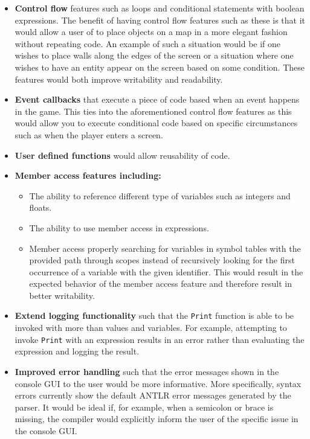 \begin{itemize}
    \item
      \textbf{Control flow} features such as loops and conditional statements with boolean expressions. The benefit of having control flow features such as these is that it would allow a user of \dazel{} to place objects on a map in a more elegant fashion without repeating code. An example of such a situation would be if one wishes to place walls along the edges of the screen or a situation where one wishes to have an entity appear on the screen based on some condition. These features would both improve writability and readability.
    \item
      \textbf{Event callbacks} that execute a piece of code based when an event happens in the game. This ties into the aforementioned control flow features as this would allow you to execute conditional code based on specific circumstances such as when the player enters a screen. 
    \item
      \textbf{User defined functions} would allow reusability of code. 
    \item
      \textbf{Member access features including:}
      \begin{itemize}
        \item
            The ability to reference different type of variables such as integers and floats.
        \item
            The ability to use member access in expressions.    
        \item
            Member access properly searching for variables in symbol tables with the provided path through scopes instead of recursively looking for the first occurrence of a variable with the given identifier. This would result in the expected behavior of the member access feature and therefore result in better writability.
      \end{itemize}
      \item
        \textbf{Extend logging functionality} such that the \texttt{Print} function is able to be invoked with more than values and variables. For example, attempting to invoke \texttt{Print} with an expression results in an error rather than evaluating the expression and logging the result.
    \item
      \textbf{Improved error handling} such that the error messages shown in the console GUI to the user would be more informative. More specifically, syntax errors currently show the default ANTLR error messages generated by the parser. It would be ideal if, for example, when a semicolon or brace is missing, the compiler would explicitly inform the user of the specific issue in the console GUI.
\end{itemize}


